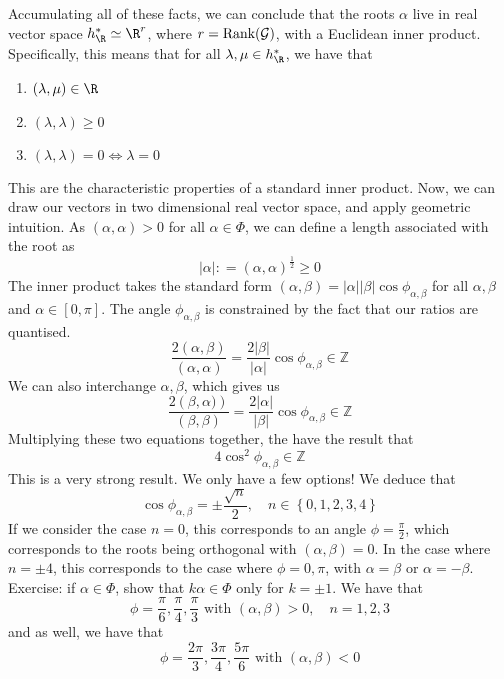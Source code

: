 Accumulating all of these facts, 
we can conclude that the roots $ \alpha $ 
live in real vector space $ \subalg ^ * _{ \R } \simeq \R ^ r $, 
where $ r = \text{Rank}( \mathcal{ G } ) $, with 
a Euclidean inner product. Specifically, this 
means that for all $ \lambda , \mu \in \subalg ^ * _{ \R }  $, 
we have that 
\begin{enumerate}
	\item $ ( \lambda , \mu ) \in \R $  
	\item $ \left(  \lambda , \lambda  \right)  \geq 0 $
	\item $ \left(  \lambda , \lambda  \right)   =0 \iff \lambda  = 0 $ 
\end{enumerate}
This are the characteristic properties of 
a standard inner product. 
Now, we can draw our vectors in two dimensional real 
vector space, and apply geometric intuition. 
As $\left(  \alpha, \alpha  \right)  > 0  $ for all $ \alpha \in \Phi   $, 
we can define a length associated with the 
root as 
\[
	| \alpha | : = ( \alpha , \alpha ) ^{ \frac{1}{2 } } \geq 0 
	\] 
The inner product takes the standard form 
$ \left(  \alpha, \beta  \right)   = | \alpha | | \beta | 
\cos \phi_{ \alpha, \beta } $  for all $ \alpha , \beta $ and 
$ \alpha \in [ 0 , \pi ] $.
The angle  $ \phi_{ \alpha ,\beta } $ is constrained by the fact that 
our ratios are quantised. 
\[
	\frac{ 2 \left(  \alpha, \beta  \right)  }{ ( \alpha , \alpha ) } 
	= \frac{2 | \beta | }{ | \alpha | } \cos \phi_{ \alpha , \beta } \in \mathbb{ Z} 
\] We can also interchange $ \alpha , \beta $, which gives us 
\[
	\frac{ 2 \left(  \beta , \alpha )  \right)  }{ \left(  
	\beta , \beta \right)  } = \frac{ 2 | \alpha | }{ | \beta |  } 
	\cos \phi_{ \alpha , \beta } \in \mathbb{ Z} 
\]  Multiplying these two equations together, 
the have the result that 
\[
	4 \cos ^ 2 \phi_{ \alpha ,\beta } \in \mathbb{ Z} 
\] This is a very strong result. 
We only have a few options! We deduce that 
\[
 \cos \phi_{ \alpha, \beta }  = \pm \frac{\sqrt{ n }  }{ 2 } , \quad 
 n \in \left\{  0 , 1, 2, 3, 4 \right\} 
\] If we consider the case $ n = 0 $, this 
corresponds to an angle $ \phi = \frac{ \pi }{ 2 } $, 
which corresponds to the roots being orthogonal with 
$ \left(  \alpha, \beta  \right)   = 0 $. 
In the case where $ n = \pm 4 $, this corresponds 
to the case where $ \phi = 0 , \pi $, with $ \alpha = \beta $ or 
$ \alpha =  - \beta $.
Exercise: if $ \alpha \in \Phi $, show that 
$ k \alpha \in \Phi $ only for $ k  =\pm 1 $. 
We have that 
\[
	\phi = \frac{\pi }{ 6 } , \frac{\pi}{ 4 }, \frac{\pi}{ 3 } \text{ with } ( \alpha , \beta ) > 0 , \quad n = 1 , 2,  3 
\] 
and as well, we have that 
\[
	\phi = \frac{ 2 \pi }{ 3 } , \frac{ 3 \pi }{ 4 } , \frac{ 5 \pi }{ 6 } \text{ with } \left( \alpha, \beta  \right) < 0 
\] 
